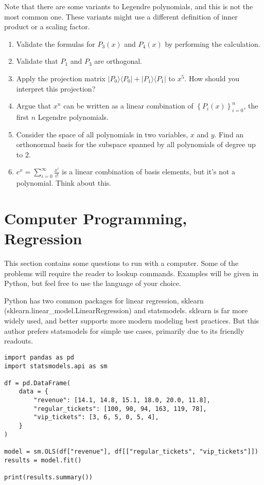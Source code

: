 \documentclass{amsbook}
\begin{document}
Note that there are some variants to Legendre polynomials, and this is not the most common one.  These variants might use a different definition of inner product or a scaling factor.

\begin{enumerate}
  \item Validate the formulas for $P_3(x)$ and $P_4(x)$ by performing the calculation.
  \item Validate that $P_1$ and $P_3$ are orthogonal.
  \item Apply the projection matrix $|P_0\rangle\langle P_0|+|P_1\rangle\langle P_1|$ to $x^5$.  How should you interpret this projection?
  \item Argue that $x^n$ can be written as a linear combination of $\left\{P_i(x)\right\}_{i=0}^n$, the first $n$ Legendre polynomials.
  \item Consider the space of all polynomials in two variables, $x$ and $y$.  Find an orthonormal basis for the subspace spanned by all polynomials of degree up to $2$.
  \item $e^x=\sum_{i=0}^\infty \frac{x^i}{i!}$ is a linear combination of basis elements, but it's not a polynomial.  Think about this.
\end{enumerate}

\section{Computer Programming, Regression}

This section contains some questions to run with a computer.  Some of the problems will require the reader to lookup commands.  Examples will be given in Python, but feel free to use the language of your choice.

Python has two common packages for linear regression, sklearn (sklearn.linear\_model.LinearRegression) and statsmodels.  sklearn is far more widely used, and better supports more modern modeling best practices.  But this author prefers statsmodels for simple use cases, primarily due to its friendly readouts.

\begin{lstlisting}
import pandas as pd
import statsmodels.api as sm

df = pd.DataFrame(
    data = {
        "revenue": [14.1, 14.8, 15.1, 18.0, 20.0, 11.8],
        "regular_tickets": [100, 90, 94, 163, 119, 78],
        "vip_tickets": [3, 6, 5, 0, 5, 4],
    }
)

model = sm.OLS(df["revenue"], df[["regular_tickets", "vip_tickets"]])
results = model.fit()

print(results.summary())
\end{lstlisting}
\end{document}

